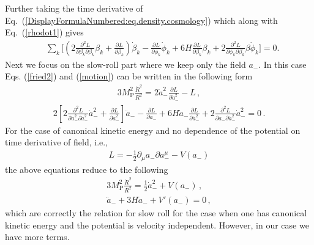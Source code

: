 \documentclass[a4paper,11pt]{article}
\def\non{\nonumber\\}
\def\non{\nonumber\\}
\begin{document}
  Further taking the time derivative of Eq.~(\ref{DisplayFormulaNumbered:eq.density.cosmology})
  which along with Eq.~(\ref{rhodot1}) gives
  \begin{align}
    &\sum_{k}\Big[ \left(2 \frac{\partial^2 L}{\partial \beta_k \partial \beta_k} \beta_k + \frac{\partial L}{\partial \beta_k}
    \right)\dot \beta_k
    - \frac{\partial L}{\partial \phi_k} \dot \phi_k + 6H \frac{\partial L}{\partial \beta_k} \beta_k
    + 2 \frac{\partial^2 L}{\partial \phi_k\partial \beta_k} \beta\dot \phi_k \Big]=0.
    \label{motion}
  \end{align}
  Next we focus on the slow-roll part where we keep only the field $a_-$. In this case Eqs. (\ref{fried2}) and (\ref{motion}) can be written in
  the following form
  \begin{align}
    3 M_\text{P}^2 \frac{\dot R^2}{R^2} = 2 \dot a_{-}^2 \frac{\partial L}{\partial \dot a_{-}^2} - L\,,
    \label{inf-1a}
  \end{align}
  \begin{align}
    2 \left[2 \frac{\partial^2 L}{\partial \dot a_{-}^2 \partial \dot a_{-}^2} \dot a_{-}^2 + \frac{\partial L}{\partial \dot a_{-}^2}
    \right] \ddot a_{-} -
    \frac{\partial L}{\partial a_{-}} + 6H \dot a_{-} \frac{\partial L}{\partial \dot a_{-}^2}
    + 2 \frac{\partial^2 L}{\partial a_{-} \partial \dot a_{-}^2} \dot a_{-}^2
    =0
    \label{inf-2a}\,.
  \end{align}
  For the case of canonical kinetic energy and no dependence of the potential on time derivative of field, i.e.,
  \begin{align}
    L= -\frac{1}{2} \partial_\mu a_{-}\partial a_{-}^{\mu} - V(a_-)
  \end{align}
  the above equations reduce to the following
  \begin{align}
    3 M_\text{P}^2 \frac{\dot R^2}{R^2} = \frac{1}{2} \dot a_{-}^2 + V(a_-)\,,\non
    \ddot a_{-} + 3 H \dot a_{-} + V'(a_{-})=0\,,
  \end{align}
  which are correctly the relation for slow roll for the case when one has canonical kinetic energy and the potential
  is velocity independent. However, in our case we have more terms.

\end{document}
